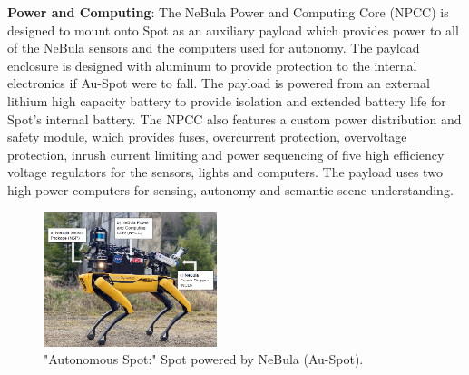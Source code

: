 \documentclass[letterpaper, 10pt, conference]{ieeeconf}      %
\newcommand{\ph}[1]{{\textbf{#1}:}} %
\begin{document}
\ph{Power and Computing}
The NeBula Power and Computing Core (NPCC) is designed to mount onto Spot as an auxiliary payload which provides power to all of the NeBula sensors and the computers used for autonomy. The payload enclosure is designed with aluminum to provide protection to the internal electronics if Au-Spot were to fall. 
The payload is powered from an external lithium high capacity battery to provide isolation and extended battery life for Spot's internal battery. 
The NPCC also features a custom power distribution and safety module, which provides fuses, overcurrent protection, overvoltage protection, inrush current limiting and power sequencing of five high efficiency voltage regulators for the sensors, lights and computers. %
The payload uses two high-power computers 
for sensing, autonomy and semantic scene understanding.

\begin{figure}[t]
  \centering
  \includegraphics[width=0.45\textwidth]{graphics/spot_full_annotated_1.PNG}
  \caption{"Autonomous Spot:" Spot powered by NeBula (Au-Spot).}
  \label{fig:spot_full_nebula_form}
\end{figure}

    
\end{document}
